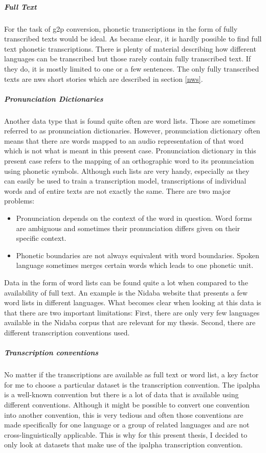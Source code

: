 \subparagraph{Full Text}
For the task of \ac{g2p} conversion, phonetic transcriptions in the form of fully transcribed texts would be ideal. As became clear, it is hardly possible to find full text phonetic transcriptions. There is plenty of material describing how different languages can be transcribed but those rarely contain fully transcribed text. If they do, it is mostly limited to one or a few sentences. The only fully transcribed texts are \ac{nws} short stories which are described in section \ref{nws}.

\subparagraph{Pronunciation Dictionaries}
Another data type that is found quite often are word lists. Those are sometimes referred to as pronunciation dictionaries. However, pronunciation dictionary often means that there are words mapped to an audio representation of that word which is not what is meant in this present case. Pronunciation dictionary in this present case refers to the mapping of an orthographic word to its pronunciation using phonetic symbols. Although such lists are very handy, especially as they can easily be used to train a transcription model, transcriptions of individual words and of entire texts are not exactly the same. There are two major problems:

\begin{itemize}
\item Pronunciation depends on the context of the word in question. Word forms are ambiguous and sometimes their pronunciation differs given on their specific context. 
\item Phonetic boundaries are not always equivalent with word boundaries. Spoken language sometimes merges certain words which leads to one phonetic unit.
\end{itemize} 

Data in the form of word lists can be found quite a lot when compared to the availability of full text. An example is the Nidaba website that presents a few word lists in different languages. What becomes clear when looking at this data is that there are two important limitations: First, there are only very few languages available in the Nidaba corpus that are relevant for my thesis. Second, there are different transcription conventions used.

\subparagraph{Transcription conventions}
No matter if the transcriptions are available as full text or word list, a key factor for me to choose a particular dataset is the transcription convention. The \ac{ipalpha} is a well-known convention but there is a lot of data that is available using different conventions. Although it might be possible to convert one convention into another convention, this is very tedious and often those conventions are made specifically for one language or a group of related languages and are not cross-linguistically applicable. This is why for this present thesis, I decided to only look at datasets that make use of the \ac{ipalpha} transcription convention.

